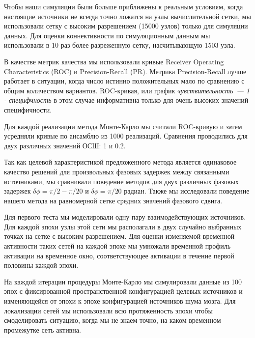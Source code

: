 Чтобы наши симуляции были больше приближены к реальным условиям, когда настоящие источники
не всегда точно ложатся на узлы вычислительной сетки, мы использовали сетку с высоким
разрешением (15000 узлов) только для симуляции данных. Для оценки
коннективности по симуляционным данным мы использовали в 10 раз более разреженную сетку,
насчитывающую 1503 узла.

В качестве метрик качества мы использовали кривые Receiver Operating Characteristics (ROC)
и Precision-Recall (PR). Метрика Precision-Recall лучше работает в ситуации, когда
число истинно положительных мало по сравнению с общим количеством вариантов.
ROC-кривая, или график \emph{чувствительность~--- 1 - специфчность} в этом случае информативна
только для очень высоких значений специфичности.

Для каждой реализации метода Монте-Карло мы считали ROC-кривую и затем
усредняли кривые по ансамблю из 1000 реализаций. Сравнения проводились для двух различных
значений ОСШ: 1 и 0.2. 

Так как целевой характеристикой предложенного метода является одинаковое качество
решений для произвольных фазовых задержек между связанными источниками, мы сравнивали
поведение методов для двух различных фазовых задержек $\delta\phi=\pi/2-\pi/20$ и
$\delta\phi=\pi/20$ радиан. Также мы исследовали поведение нашего метода на
равномерной сетке средних значений фазового сдвига.

Для первого теста мы моделировали одну пару взаимодействующих источников. Для каждой эпохи
узлы этой сети мы располагали в двух случайно выбранных точках на сетке с высоким разрешением.
Для оценки изменяемой временной активности таких сетей на каждой эпохе мы умножали временной
профиль активации на временное окно, соответствующее активации в течение первой половины
каждой эпохи. %

На каждой итерации процедуры Монте-Карло мы симулировали данные из 100 эпох с фиксированной
пространственной конфигурацией целевых источников и изменяющейся от эпохи к эпохе конфигурацией
источников шума мозга. Для локализации сетей мы использовали всю протяженность эпохи
чтобы смоделировать ситуацию, когда мы не знаем точно, на каком временном промежутке
сеть активна.

